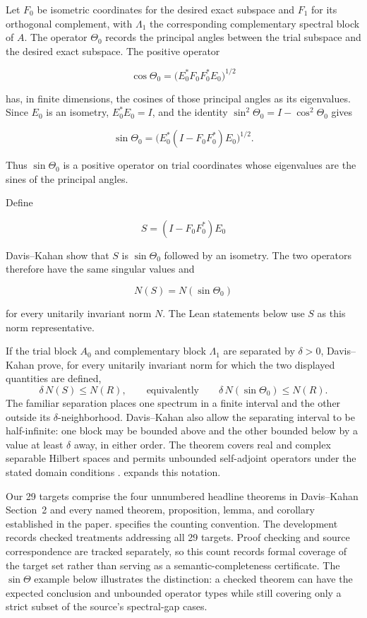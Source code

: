 \documentclass{article}
\begin{document}
Let $F_0$ be isometric coordinates for the desired exact subspace and $F_1$ for
its orthogonal complement, with $\Lambda_1$ the corresponding complementary
spectral block of $A$. The operator $\Theta_0$ records the principal angles
between the trial subspace and the desired exact subspace. The positive
operator

$$
  \cos\Theta_0
  = \bigl(E_0^*F_0F_0^*E_0\bigr)^{1/2}
$$

has, in finite dimensions, the cosines of those principal angles as its
eigenvalues. Since $E_0$ is an isometry, $E_0^*E_0=I$, and the identity
$\sin^2\Theta_0=I-\cos^2\Theta_0$ gives

$$
  \sin\Theta_0
  = \bigl(E_0^*(I-F_0F_0^*)E_0\bigr)^{1/2}.
$$

Thus $\sin\Theta_0$ is a positive operator on trial coordinates whose
eigenvalues are the sines of the principal angles.

Define

\begin{equation}
  S=(I-F_0F_0^*)E_0
  \label{eq:sin-theta-representative}
\end{equation}

Davis--Kahan show that $S$ is $\sin\Theta_0$ followed by an isometry. The two
operators therefore have the same singular values and

$$
  N(S)=N(\sin\Theta_0)
$$

for every unitarily invariant norm $N$. The Lean statements below use $S$ as
this norm representative.

If the trial block $A_0$ and complementary block $\Lambda_1$ are separated by
$\delta>0$, Davis--Kahan prove, for every unitarily invariant norm for which the
two displayed quantities are defined,
\begin{equation}
  \delta\,N(S)\le N(R),
  \qquad\text{equivalently}\qquad
  \delta\,N(\sin\Theta_0)\le N(R).
  \label{eq:sin-theta}
\end{equation}
The familiar separation places one spectrum in a finite interval and the other
outside its $\delta$-neighborhood.  Davis--Kahan also allow the separating
interval to be half-infinite: one block may be bounded above and the other
bounded below by a value at least $\delta$ away, in either order.  The theorem
covers real and complex separable Hilbert spaces and permits unbounded
self-adjoint operators under the stated domain conditions
\citep{davis1970rotation}.   expands this notation.

Our 29 targets comprise the four unnumbered headline theorems in Davis--Kahan
Section~2 and every named theorem, proposition, lemma, and corollary established
in the paper.  specifies the counting convention. The development
records checked treatments addressing all 29 targets.  Proof checking and
source correspondence are tracked separately, so this count records formal
coverage of the target set rather than serving as a semantic-completeness
certificate.  The $\sin\Theta$ example below illustrates the distinction: a
checked theorem can have the expected conclusion and unbounded operator types
while still covering only a strict subset of the source's spectral-gap cases.
\end{document}
